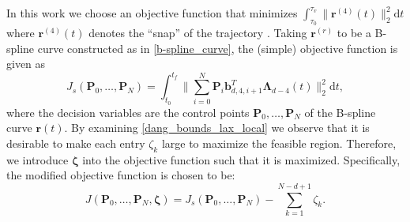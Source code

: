 \documentclass[journal,10pt]{IEEEtran}
\newcommand{\vect}[1]{\boldsymbol{\mathbf{#1}}}
\newcommand{\mat}[1]{\begin{bmatrix} #1 \end{bmatrix}}
\newif\ifdraft
\newcommand{\XX}[1]{\ifdraft{\color{red}[{\bf XX}: #1]}\fi}
\newcommand{\VF}[1]{\ifdraft{\color{blue}[{\bf VF}: #1]}\fi}
\begin{document}
In this work we choose an objective function that minimizes $\int_{\tau_0}^{\tau_v}\|\vect{r}^{(4)}(t)\|^2_2 \mathrm{d}t$ where $\vect{r}^{(4)}(t)$ denotes the ``snap'' of the trajectory \cite{min_snap}. 
Taking $\vect{r}^{(r)}$ to be a B-spline curve constructed as in \eqref{b-spline_curve}, the (simple) objective function is given as 
\begin{equation*}%
    J_s(\vect{P}_{0},\dots,\vect{P}_{N}) = \int_{t_0}^{t_f}\bigg\|\sum_{i=0}^N\vect{P}_i\vect{b}_{d,4,i+1}^T\vect{\Lambda}_{d-4}(t)\bigg\|_2^2 \mathrm{d}t,
\end{equation*}
where the decision variables are the control points $\vect{P}_0,\ldots,\vect{P}_N$ of the B-spline curve $\vect{r}(t)$. %
By examining \eqref{dang_bounds_lax_local} we observe that it is desirable to make each entry $\zeta_k$ large to maximize the feasible region. Therefore, we  introduce $\vect{\zeta}$ into the objective function such that it is maximized. Specifically, the modified objective function is chosen to be:
\begin{equation} \label{obj_dang_bounds}
    J(\vect{P}_0,\dots,\vect{P}_{N},\vect{\zeta}) = J_s(\vect{P}_0,\dots,\vect{P}_{N})- \sum_{k=1}^{N-d+1}\zeta_{k}.
\end{equation}


\end{document}
